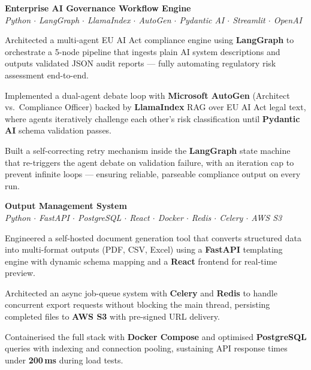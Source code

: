 \documentclass[letterpaper,10pt]{article}
\newcommand{\heading}[2]{
  \hspace{10pt}#1\hfill#2\\
}
\newcommand{\headingBf}[2]{
  \heading{\textbf{#1}}{\textbf{#2}}
}
\newcommand{\headingIt}[2]{
  \heading{\textit{#1}}{\textit{#2}}
}
\newenvironment{resume_list}{
  \vspace{-7pt}
  \begin{itemize}[itemsep=-2px, parsep=1pt, leftmargin=30pt]
}{
  \end{itemize}
}
\begin{document}
\headingBf{Enterprise AI Governance Workflow Engine}{}
  \headingIt{Python $\cdot$ LangGraph $\cdot$ LlamaIndex $\cdot$ AutoGen $\cdot$ Pydantic AI $\cdot$ Streamlit $\cdot$ OpenAI}{}
  \begin{resume_list}
    \item Architected a multi-agent EU AI Act compliance engine using \textbf{LangGraph} to orchestrate a 5-node pipeline that ingests plain AI system descriptions and outputs validated JSON audit reports — fully automating regulatory risk assessment end-to-end.
    \item Implemented a dual-agent debate loop with \textbf{Microsoft AutoGen} (Architect vs.\ Compliance Officer) backed by \textbf{LlamaIndex} RAG over EU AI Act legal text, where agents iteratively challenge each other's risk classification until \textbf{Pydantic AI} schema validation passes.
    \item Built a self-correcting retry mechanism inside the \textbf{LangGraph} state machine that re-triggers the agent debate on validation failure, with an iteration cap to prevent infinite loops — ensuring reliable, parseable compliance output on every run.
    \vspace{1pt}
  \end{resume_list}


\headingBf{Output Management System}{}
\headingIt{Python $\cdot$ FastAPI $\cdot$ PostgreSQL $\cdot$ React $\cdot$ Docker $\cdot$ Redis $\cdot$ Celery $\cdot$ AWS S3}{}
\begin{resume_list}
  \item Engineered a self-hosted document generation tool that converts structured data into multi-format outputs (PDF, CSV, Excel) using a \textbf{FastAPI} templating engine with dynamic schema mapping and a \textbf{React} frontend for real-time preview.
  \item Architected an async job-queue system with \textbf{Celery} and \textbf{Redis} to handle concurrent export requests without blocking the main thread, persisting completed files to \textbf{AWS S3} with pre-signed URL delivery.
  \item Containerised the full stack with \textbf{Docker Compose} and optimised \textbf{PostgreSQL} queries with indexing and connection pooling, sustaining API response times under \textbf{200\,ms} during load tests.
  \vspace{1pt}
\end{resume_list}


\end{document}
